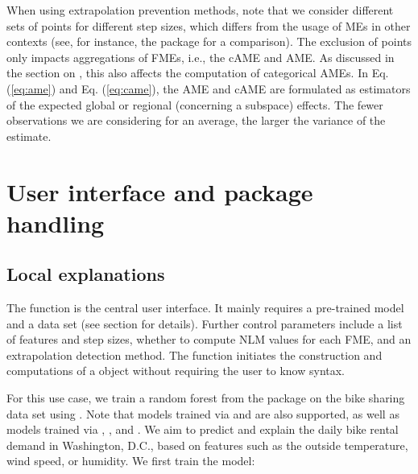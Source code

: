 \par
When using extrapolation prevention methods, note that we consider different sets of points for different step sizes, which differs from the usage of MEs in other contexts (see, for instance, the package  for a comparison). The exclusion of points only impacts aggregations of FMEs, i.e., the cAME and AME. As discussed in the section on , this also affects the computation of categorical AMEs. In Eq. (\ref{eq:ame}) and Eq. (\ref{eq:came}), the AME and cAME are formulated as estimators of the expected global or regional (concerning a subspace) effects. The fewer observations we are considering for an average, the larger the variance of the estimate.


\section{User interface and package handling}
\label{sec:user_interface_package_handling}
\subsection{Local explanations}


The  function is the central user interface. 
It mainly requires a pre-trained model and a data set (see section  for details). 
Further control parameters include a list of features and step sizes, whether to compute NLM values for each FME, and an extrapolation detection method. The  function initiates the construction and computations of a  object without requiring the user to know  \citep{r6} syntax.
\par
For this use case, we train a random forest from the  package \citep{randomForest_package} on the bike sharing data set \citep{misc_bike_sharing_dataset_275} using . Note that models trained via  and  are also supported, as well as models trained via , , and . We aim to predict and explain the daily bike rental demand in Washington, D.C., based on features such as the outside temperature, wind speed, or humidity. We first train the model:


